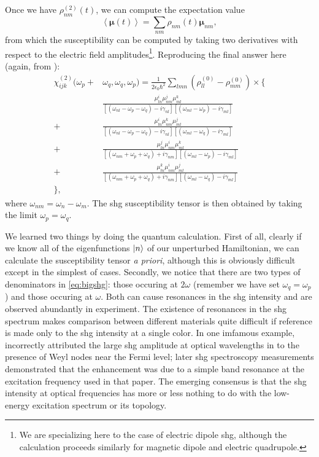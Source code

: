Once we have $\rho_{nm}^{(2)}(t)$, we can compute the expectation value
\begin{equation}
\left<\bm{\mu}(t)\right>=\sum_{nm}\rho_{nm}(t)\bm{\mu}_{nm},
\end{equation}
from which the susceptibility can be computed by taking two derivatives with respect to the electric field amplitudes\footnote{We are specializing here to the case of electric dipole \gls{shg}, although the calculation proceeds similarly for magnetic dipole and electric quadrupole.}.
Reproducing the final answer here (again, from \citet{boyd}):
\begin{equation}\label{eq:bigshg}
\begin{aligned}
\chi_{ijk}^{(2)}(\omega_p+&\omega_q, \omega_q, \omega_p) = \frac{1}{2\epsilon_0\hbar^2}\sum_{lmn}(\rho_{ll}^{(0)}-\rho_{mm}^{(0)})\times\Big\{\\
&\frac{\mu^i_{ln}\mu^j_{nm}\mu^k_{ml}}{[(\omega_{nl}-\omega_p-\omega_q)-i\gamma_{nl}][(\omega_{ml}-\omega_p)-i\gamma_{ml}]}\\
+&\frac{\mu^i_{ln}\mu^k_{nm}\mu^j_{ml}}{[(\omega_{nl}-\omega_p-\omega_q)-i\gamma_{nl}][(\omega_{ml}-\omega_q)-i\gamma_{ml}]}\\
+&\frac{\mu^j_{ln}\mu^i_{nm}\mu^k_{ml}}{[(\omega_{nm}+\omega_p+\omega_q)+i\gamma_{nm}][(\omega_{ml}-\omega_p)-i\gamma_{ml}]}\\
+&\frac{\mu^k_{ln}\mu^i_{nm}\mu^j_{ml}}{[(\omega_{nm}+\omega_p+\omega_q)+i\gamma_{nm}][(\omega_{ml}-\omega_q)-i\gamma_{ml}]}\\
\Big\},
\end{aligned}
\end{equation}
where $\omega_{nm}=\omega_n-\omega_m$.
The \gls{shg} susceptibility tensor is then obtained by taking the limit $\omega_p=\omega_q$.

We learned two things by doing the quantum calculation.
First of all, clearly if we know all of the eigenfunctions $\ket{n}$ of our unperturbed Hamiltonian, we can calculate the susceptibility tensor \textit{a priori}, although this is obviously difficult except in the simplest of cases.
Secondly, we notice that there are two types of denominators in \cref{eq:bigshg}: those occuring at $2\omega$ (remember we have set $\omega_q=\omega_p$) and those occuring at $\omega$.
Both can cause resonances in the \gls{shg} intensity and are observed abundantly in experiment\citep{fiebig_second_2001}.
The existence of resonances in the \gls{shg} spectrum makes comparison between different materials quite difficult if reference is made only to the \gls{shg} intensity at a single color.
In one imfamous example, \citet{wu_giant_2017} incorrectly attributed the large \gls{shg} amplitude at optical wavelengths in  to the presence of Weyl nodes near the Fermi level; later \gls{shg} spectroscopy measurements demonstrated that the enhancement was due to a simple band resonance at the excitation frequency used in that paper\citep{patankar_resonance-enhanced_2018}.
The emerging consensus is that the \gls{shg} intensity at optical frequencies has more or less nothing to do with the low-energy excitation spectrum or its topology.

